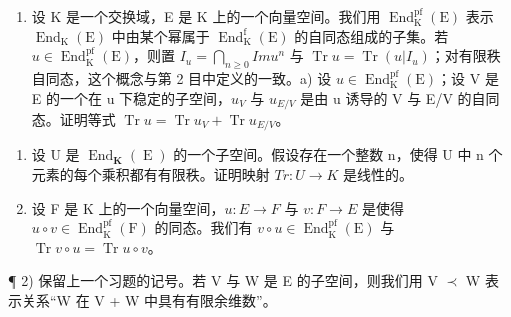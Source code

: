 
\begin{enumerate}
\def\labelenumi{\arabic{enumi})}
\tightlist
\item
  设 K 是一个交换域，E 是 K 上的一个向量空间。我们用 \(\operatorname{End}_{\mathrm{K}}^{\mathrm{pf}}(\mathrm{E})\) 表示 \(\operatorname{End}_{\mathrm{K}}(\mathrm{E})\) 中由某个幂属于 \(\operatorname{End}_{\mathrm{K}}^{\mathrm{f}}(\mathrm{E})\) 的自同态组成的子集。若 \(u \in \operatorname{End}_{\mathrm{K}}^{\mathrm{pf}}(\mathrm{E})\)，则置 \(I_{u} = \bigcap_{n \geqslant 0} Im u^{n}\) 与 \(\operatorname{Tr} u = \operatorname{Tr}(u | I_{u})\)；对有限秩自同态，这个概念与第 2 目中定义的一致。a) 设 \(u \in \operatorname{End}_{\mathrm{K}}^{\mathrm{pf}}(\mathrm{E})\)；设 V 是 E 的一个在 u 下稳定的子空间，\(u_{V}\) 与 \(u_{E/V}\) 是由 u 诱导的 V 与 E/V 的自同态。证明等式 \(\operatorname{Tr} u = \operatorname{Tr} u_{V} + \operatorname{Tr} u_{E/V}\)。
\end{enumerate}

\begin{enumerate}
\def\labelenumi{\alph{enumi})}
\setcounter{enumi}{1}
\item
  设 U 是 \(\operatorname{End}_{\mathbf{K}}(\operatorname{E})\) 的一个子空间。假设存在一个整数 n，使得 U 中 n 个元素的每个乘积都有有限秩。证明映射 \(Tr: U \to K\) 是线性的。
\item
  设 F 是 K 上的一个向量空间，\(u: E \to F\) 与 \(v: F \to E\) 是使得 \(u \circ v \in \operatorname{End}_{\mathrm{K}}^{\mathrm{pf}}(\mathrm{F})\) 的同态。我们有 \(v \circ u \in \operatorname{End}_{\mathrm{K}}^{\mathrm{pf}}(\mathrm{E})\) 与 \(\operatorname{Tr} v \circ u = \operatorname{Tr} u \circ v\)。
\end{enumerate}

¶ 2) 保留上一个习题的记号。若 V 与 W 是 E 的子空间，则我们用 V \(\prec\) W 表示关系“W 在 V + W 中具有有限余维数”。

